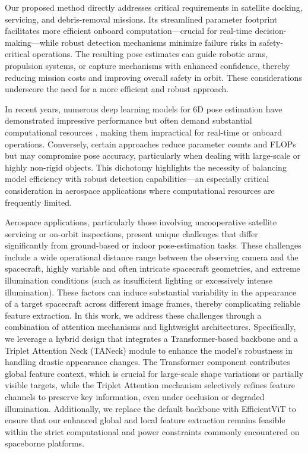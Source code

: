 \documentclass[a4paper,fleqn]{cas-sc}
\begin{document}
Our proposed method directly addresses critical requirements in satellite docking, servicing, and debris-removal missions. Its streamlined parameter footprint facilitates more efficient onboard computation—crucial for real-time decision-making—while robust detection mechanisms minimize failure risks in safety-critical operations. The resulting pose estimates can guide robotic arms, propulsion systems, or capture mechanisms with enhanced confidence, thereby reducing mission costs and improving overall safety in orbit. These considerations underscore the need for a more efficient and robust approach.

In recent years, numerous deep learning models for 6D pose estimation have demonstrated impressive performance but often demand substantial computational resources \citep{Pavlakos_2017_ICRA,He_2020_CVPR, peng2019pvnet}, making them impractical for real-time or onboard operations. Conversely, certain approaches reduce parameter counts and FLOPs \citep{Zhao_2020_CVPR} but may compromise pose accuracy, particularly when dealing with large-scale or highly non-rigid objects. This dichotomy highlights the necessity of balancing model efficiency with robust detection capabilities—an especially critical consideration in aerospace applications where computational resources are frequently limited.

Aerospace applications, particularly those involving uncooperative satellite servicing or on-orbit inspections, present unique challenges that differ significantly from ground-based or indoor pose-estimation tasks. These challenges include a wide operational distance range between the observing camera and the spacecraft, highly variable and often intricate spacecraft geometries, and extreme illumination conditions (such as insufficient lighting or excessively intense illumination). These factors can induce substantial variability in the appearance of a target spacecraft across different image frames, thereby complicating reliable feature extraction. In this work, we address these challenges through a combination of attention mechanisms and lightweight architectures. Specifically, we leverage a hybrid design that integrates a Transformer-based backbone and a Triplet Attention Neck (TANeck) module to enhance the model's robustness in handling drastic appearance changes. The Transformer component contributes global feature context, which is crucial for large-scale shape variations or partially visible targets, while the Triplet Attention mechanism selectively refines feature channels to preserve key information, even under occlusion or degraded illumination. Additionally, we replace the default backbone with EfficientViT to ensure that our enhanced global and local feature extraction remains feasible within the strict computational and power constraints commonly encountered on spaceborne platforms.
\end{document}
